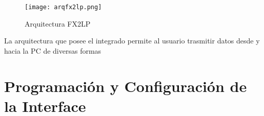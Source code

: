 	\begin{figure}
		\centering
		\texttt{[image: arqfx2lp.png]}
		\caption{Arquitectura FX2LP} 
		\label{arqExUSB}
	\end{figure}

	La arquitectura que posee el integrado permite al usuario trasmitir datos desde y hacia la PC de diversas formas
\section{Programación y Configuración de la Interface}



%
